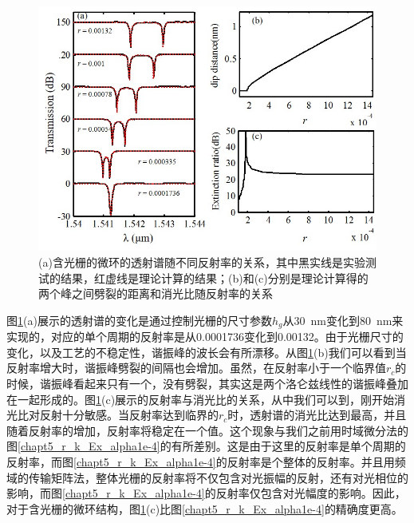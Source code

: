 \begin{figure}[htb]
	\centering
	\includegraphics[width=12cm]{./Pictures/chapt5_ring_grating_vary_reflector.jpg}
	\caption{(a)含光栅的微环的透射谱随不同反射率的关系，其中黑实线是实验测试的结果，红虚线是理论计算的结果；(b)和(c)分别是理论计算得的两个峰之间劈裂的距离和消光比随反射率的关系}
	\label{chapt5_ring_grating_vary_reflector}
\end{figure}

图\ref{chapt5_ring_grating_vary_reflector}(a)展示的透射谱的变化是通过控制光栅的尺寸参数$h_g$从30~nm变化到80~nm来实现的，对应的单个周期的反射率是从0.0001736变化到0.00132。由于光栅尺寸的变化，以及工艺的不稳定性，谐振峰的波长会有所漂移。从图\ref{chapt5_ring_grating_vary_reflector}(b)我们可以看到当反射率增大时，谐振峰劈裂的间隔也会增加。虽然，在反射率小于一个临界值$r_c$的时候，谐振峰看起来只有一个，没有劈裂，其实这是两个洛仑兹线性的谐振峰叠加在一起形成的。图\ref{chapt5_ring_grating_vary_reflector}(c)展示的反射率与消光比的关系，从中我们可以到，刚开始消光比对反射十分敏感。当反射率达到临界的$r_c$时，透射谱的消光比达到最高，并且随着反射率的增加，反射率将稳定在一个值。这个现象与我们之前用时域微分法的图\ref{chapt5_r_k_Ex_alpha1e-4}的有所差别。这是由于这里的反射率是单个周期的反射率，而图\ref{chapt5_r_k_Ex_alpha1e-4}的反射率是个整体的反射率。并且用频域的传输矩阵法，整体光栅的反射率将不仅包含对光振幅的反射，还有对光相位的影响，而图\ref{chapt5_r_k_Ex_alpha1e-4}的反射率仅包含对光幅度的影响。因此，对于含光栅的微环结构，图\ref{chapt5_ring_grating_vary_reflector}(c)比图\ref{chapt5_r_k_Ex_alpha1e-4}的精确度更高。

